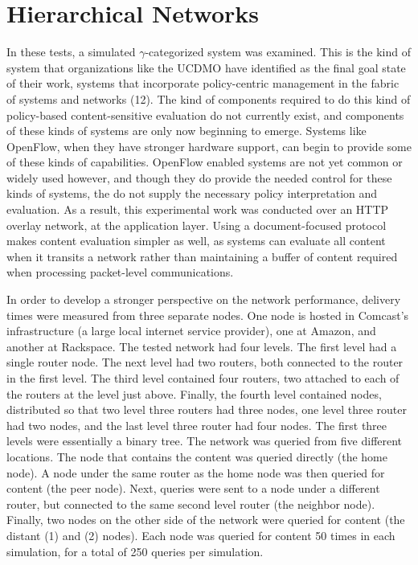 \section{Hierarchical Networks}
In these tests, a simulated $\gamma$-categorized system was examined.  This is the kind of system that organizations like the UCDMO have identified as the final goal state of their work, systems that incorporate policy-centric management in the fabric of systems and networks (12).  The kind of components required to do this kind of policy-based content-sensitive evaluation do not currently exist, and components of these kinds of systems are only now beginning to emerge.  Systems like OpenFlow, when they have stronger hardware support, can begin to provide some of these kinds of capabilities.  OpenFlow enabled systems are not yet common or widely used however, and though they do provide the needed control for these kinds of systems, the do not supply the necessary policy interpretation and evaluation.  As a result, this experimental work was conducted over an HTTP overlay network, at the application layer.  Using a document-focused protocol makes content evaluation simpler as well, as systems can evaluate all content when it transits a network rather than maintaining a buffer of content required when processing packet-level communications.

In order to develop a stronger perspective on the network performance, delivery times were measured from three separate nodes.   One node is hosted in Comcast's infrastructure (a large local internet service provider), one at Amazon, and another at Rackspace.  The tested network had four levels.  The first level had a single router node.  The next level had two routers, both connected to the router in the first level.  The third level contained four routers, two attached to each of the routers at the level just above.  Finally, the fourth level contained nodes, distributed so that two level three routers had three nodes, one level three router had two nodes, and the last level three router had four nodes.  The first three levels were essentially a binary tree.  The network was queried from five different locations.  The node that contains the content was queried directly (the home node).  A node under the same router as the home node was then queried for content (the peer node).  Next, queries were sent to a node under a different router, but connected to the same second level router (the neighbor node).  Finally, two nodes on the other side of the network were queried for content (the distant (1) and (2) nodes).  Each node was queried for content 50 times in each simulation, for a total of 250 queries per simulation.

